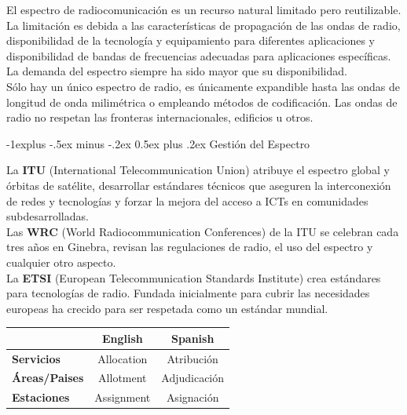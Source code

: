 \documentclass[10pt,portrait, twocolumn]{article}
\makeatletter
\renewcommand{\subsection}{\@startsection{subsection}{2}{0mm}%
                                {-1explus -.5ex minus -.2ex}%
                                {0.5ex plus .2ex}%
                                {\normalfont\normalsize\bfseries}}
\makeatother
\begin{document}
El espectro de radiocomunicación es un recurso natural limitado pero reutilizable. La limitación es debida a las características de propagación de las ondas de radio, disponibilidad de la tecnología y equipamiento para diferentes aplicaciones y disponibilidad de bandas de frecuencias adecuadas para aplicaciones específicas. La demanda del espectro siempre ha sido mayor que su disponibilidad.\\

Sólo hay un único espectro de radio, es únicamente expandible hasta las ondas de longitud de onda milimétrica o empleando métodos de codificación. Las ondas de radio no respetan las fronteras internacionales, edificios u otros.

\subsection{Gestión del Espectro}

La \textbf{ITU} (International Telecommunication Union) atribuye el espectro global y órbitas de satélite, desarrollar estándares técnicos que aseguren la interconexión de redes y tecnologías y forzar la mejora del acceso a ICTs en comunidades subdesarrolladas.\\

Las \textbf{WRC} (World Radiocommunication Conferences) de la ITU se celebran cada tres años en Ginebra, revisan las regulaciones de radio, el uso del espectro y cualquier otro aspecto.\\

La \textbf{ETSI} (European Telecommunication Standards Institute) crea estándares para tecnologías de radio. Fundada inicialmente para cubrir las necesidades europeas ha crecido para ser respetada como un estándar mundial.

\begin{center}
\begin{tabular}{l|c|c|}
\cline{2-3}
                                            & \textbf{English} & \textbf{Spanish} \\ \hline
\multicolumn{1}{|l|}{\textbf{Servicios}}    & Allocation       & Atribución       \\ \hline
\multicolumn{1}{|l|}{\textbf{Áreas/Paises}} & Allotment        & Adjudicación     \\ \hline
\multicolumn{1}{|l|}{\textbf{Estaciones}}   & Assignment       & Asignación       \\ \hline
\end{tabular}
\end{center}
\end{document}
